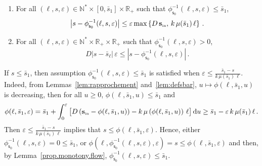 \documentclass[AHL,Unicode,longabstracts,published]{cedram}
\newcommand{\RR}{\mathbb{R}}
\newcommand{\NN}{\mathbb{N}}
\newcommand{\Sin}{{\mathbf s}_{\textrm{\tiny\rm in}}}
\newcommand{\dif}{\mathrm{d}}
\newcommand{\barmu}{\mu(\bar s_1)}
\newcommand{\phis}{\phi_{\textsf{s}_0}^{-1}}
\newcommand{\1}{\mathbf{1}}
\begin{document}
\begin{lemm}\label{lemme.control.phi_moins_s}\leavevmode
\begin{enumerate}
\item \label{lemme.control.phi_moins_s.maj}
For all $(\ell,s,\varepsilon)\in \NN^* \times [0,\bar s_1]\times \RR_+$ such that $\phis(\ell,s,\varepsilon)\leq \bar s_1$,
\[
\left|s-\phis(\ell,s,\varepsilon)\right| \leq \varepsilon \max\left\{D\,\Sin,\,k\,\barmu\,\ell\right\}\,.
\]
\item \label{lemme.control.phi_moins_s.min}
For all $(\ell,s,\varepsilon)\in \NN^* \times \RR_+\times \RR_+$ such that $\phis(\ell,s,\varepsilon)>0$,
\[
D|s-\bar s_\ell|\,\varepsilon \leq \left|s-\phis(\ell,s,\varepsilon)\right|\,.
\]
\end{enumerate}
\end{lemm}


\begin{rema}\label{phis0.less.sin}
If $s\leq \bar s_1$, then assumption $\phis(\ell,s,\varepsilon)\leq \bar s_1$ is satisfied when $\varepsilon\leq \frac{\bar s_1-s}{k\,\barmu\,\ell}$. Indeed, from Lemmas~\ref{lem:rapprochement} and~\ref{lem:defsbar}, $u\mapsto \phi(\ell,\bar s_1,u)$ is decreasing, then for all $u\geq 0$, $\phi(\ell,\bar s_1,u)\leq \bar s_1$ and
\begin{align*}
\phi(\ell,\bar s_1,\varepsilon) = \bar s_1 + \int_0^\varepsilon \big[D\left(\Sin-\phi(\ell,\bar s_1, u)\right)-k\,\mu\left(\phi(\ell,\bar s_1, u)\right)\,\ell\big]\,\dif u
\geq \bar s_1-\varepsilon\,k\,\barmu\,\ell\,.
\end{align*}
Then $\varepsilon\leq \frac{\bar s_1-s}{k\,\barmu\,\ell}$ implies that $s\leq \phi(\ell,\bar s_1,\varepsilon)$. Hence, either $\phis(\ell,s,\varepsilon)=0\leq \bar s_1$, or $\phi(\ell,\phis(\ell,s,\varepsilon),\varepsilon) = s \leq \phi(\ell,\bar s_1,\varepsilon)$ and then, by Lemma~\ref{prop.monotony.flow}, $\phis(\ell,s,\varepsilon)\leq \bar s_1$.
\end{rema}
\end{document}

